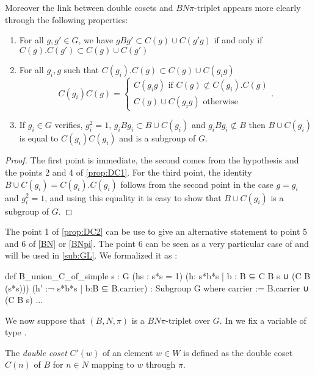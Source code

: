 Moreover the link between double cosets and $BN\pi$-triplet appears more clearly through the following properties: 

\begin{proprietes} \label{prop:DC2}
    \begin{enumerate}
\item For all $g,g' \in G$, we have  $g B g' \subset C(g) \cup C(g'g) $ if and only if $C(g). C(g') \subset C(g) \cup  C(g')$
\item For all $g_i, g$ such that $C(g_i).C(g) \subset C(g) \cup C(g_i g)$
     \[
     C(g_i) C(g) = \begin{cases}
         C(g_ig) \text{ if } C(g) \not \subset C(g_i).C(g)\\
         C(g) \cup C(g_ig) \text{ otherwise}
     \end{cases}
     .\] 
 \item If $g_{i} \in G$ verifies, $g_{i}^2 = 1$,  $g_{i} B g_{i} \subset B \cup C(g_{i})$ and $g_{i} B g_{i} \not\subset B$ then $B \cup C(g_{i})$  is equal to $C(g_i) C(g_i)$ and is a subgroup of $G$.
    \end{enumerate}
\end{proprietes}

\begin{proof}
The first point is immediate, the second comes from the hypothesis and the points 2 and 4 of \ref{prop:DC1}. For the third point, the identity $B \cup C(g_{i}) = C(g_i). C\left( g_i \right)$  follows from the second point in the case $g = g_i$ and $g_i ^2 = 1$, and using this equality it is easy to show that $B \cup C(g_i)$ is a subgroup of $G$.
\end{proof} 

The point 1 of \ref{prop:DC2} can be use to give an alternative statement to point 5 and 6 of \ref{BN} or \ref{BNpi}. The point $6$ can be seen as a very particular case of  and will be used in \ref{sub:GL}. We formalized it as :
\begin{leancode}
def B_union_C_of_simple {s : G} (hs : s*s = 1) (h: {s*b*s | b : B} ⊆ C B s ∪ (C B (s*s)))
    (h' :¬ {s*b*s | b:B} ⊆ B.carrier) : Subgroup G where
  carrier := B.carrier ∪ (C B s)
  ...
\end{leancode}

We now suppose that $\left( B,N, \pi \right)$ is a $BN\pi$-triplet over $G$. In \Lean we fix a variable  of type . 

\begin{definition}[LE NAAAAAAAME] \label{def:BNDC}
The \emph{double coset} $C'(w)$ of an element $w\in W$ is defined as the double coset $C(n)$ of $B$ for $n \in N$ mapping to $w$ through $\pi$.
\end{definition}

